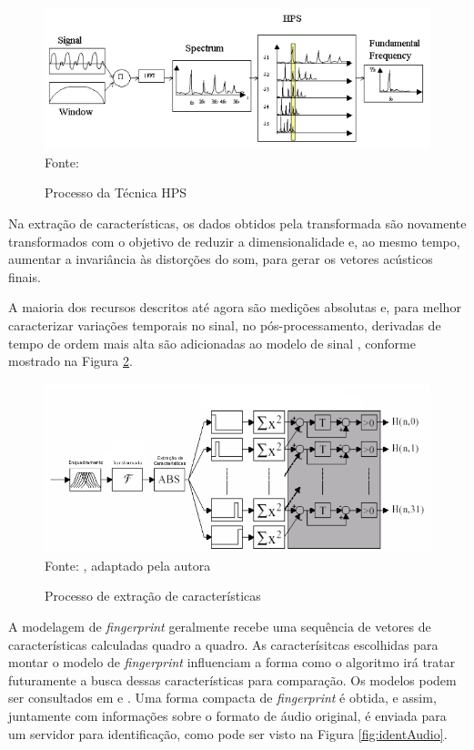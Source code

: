 \begin{figure}[!htb]
   \centering
   \caption{Processo da Técnica HPS}\label{fig:hps} 
   \includegraphics[scale=0.62]{figuras/hps.png}
   \\Fonte: \cite{santos2011}
\end{figure}

Na extração de características, os dados obtidos pela transformada são novamente transformados com o objetivo de reduzir a dimensionalidade e, ao mesmo tempo, aumentar a invariância às distorções do som, para gerar os vetores acústicos finais.

A maioria dos recursos descritos até agora são medições absolutas e, para melhor caracterizar variações temporais no sinal, no pós-processamento, derivadas de tempo de ordem mais alta são adicionadas ao modelo de sinal \cite{cano2005}, conforme mostrado na Figura \ref{fig:extCaract}.

\begin{figure}[!htb]
   \centering
   \caption{Processo de extração de características}\label{fig:extCaract} 
   \includegraphics[scale=0.47]{figuras/extCaract.png}
   \\Fonte: \cite{haitsma2002}, adaptado pela autora
\end{figure}

A modelagem de \textit{fingerprint} geralmente recebe uma sequência de vetores de características calculadas quadro a quadro. As caracterísitcas escolhidas para montar o modelo de \textit{fingerprint} influenciam a forma como o algoritmo irá tratar futuramente a busca dessas características para comparação. Os modelos podem ser consultados em \cite{cano2005} e \cite{haitsma2002}. Uma forma compacta de \textit{fingerprint} é obtida, e assim, juntamente com informações sobre o formato de áudio original, é enviada para um servidor para identificação, como pode ser visto na Figura \ref{fig:identAudio}.

